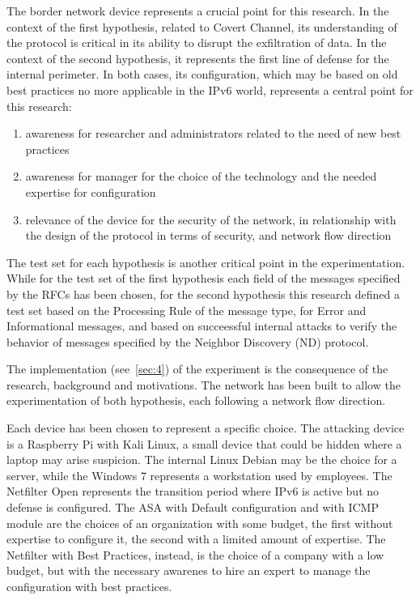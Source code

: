 \documentclass[12pt]{article}
\begin{document}
The border network device represents a crucial point for this research. In the context of the first hypothesis, related to Covert Channel, its understanding of the protocol is critical in its ability to disrupt the exfiltration of data. In the context of the second hypothesis, it represents the first line of defense for the internal perimeter. In both cases, its configuration, which may be based on old best practices no more applicable in the IPv6 world, represents a central point for this research:
\begin{enumerate}[noitemsep,topsep=0pt,partopsep=0pt]
 \item awareness for researcher and administrators related to the need of new best practices
 \item awareness for manager for the choice of the technology and the needed expertise for configuration
 \item relevance of the device for the security of the network, in relationship with the design of the protocol in terms of security, and network flow direction
\end{enumerate}

The test set for each hypothesis is another critical point in the experimentation. While for the test set of the first hypothesis each field of the messages specified by the RFCs has been chosen, for the second hypothesis this research defined a test set based on the Processing Rule of the message type, for Error and Informational messages, and based on succeessful internal attacks to verify the behavior of messages specified by the Neighbor Discovery (ND) protocol.

The implementation (see~\cref{sec:4}) of the experiment is the consequence of the research, background and motivations. The network has been built to allow the experimentation of both hypothesis, each following a network flow direction.

Each device has been chosen to represent a specific choice. The attacking device is a Raspberry Pi with Kali Linux, a small device that could be hidden where a laptop may arise suspicion. The internal Linux Debian may be the choice for a server, while the Windows 7 represents a workstation used by employees. The Netfilter Open represents the transition period where IPv6 is active but no defense is configured. The ASA with Default configuration and with ICMP module are the choices of an organization with some budget, the first without expertise to configure it, the second with a limited amount of expertise. The Netfilter with Best Practices, instead, is the choice of a company with a low budget, but with the necessary awarenes to hire an expert to manage the configuration with best practices.
\end{document}
